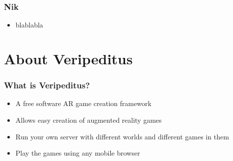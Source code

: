 \documentclass[aspectratio=43]{beamer}
\begin{document}
 \begin{frame}
  \frametitle{Nik}

  \begin{itemize}
   \item{blablabla}
  \end{itemize}
 \end{frame}

 \section{About Veripeditus}

 \begin{frame}
  \frametitle{What is Veripeditus?}

  \begin{itemize}
   \item{A free software AR game creation framework}
   \item{Allows easy creation of augmented reality games}
   \item{Run your own server with different worlds and different games in them}
   \item{Play the games using any mobile browser}
  \end{itemize}
 \end{frame}
\end{document}
